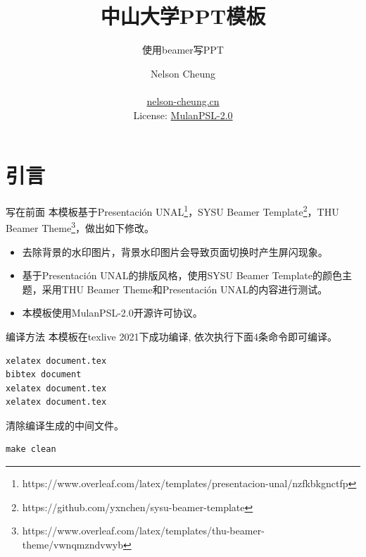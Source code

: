 \documentclass{libs/format}
\title[sysu ppt template]{中山大学PPT模板}
\subtitle{使用beamer写PPT}
\institute[Sun Yat-Sen University]{
  计算机学院 \\ 
  中山大学}
\date[\ctoday]{\ctoday}
\begin{document}


\author[Nelson Cheung]{
  Nelson Cheung \\\medskip
  {} \\
  {\url{nelson-cheung.cn}} \\
  {\small{License: \href{https://license.coscl.org.cn/MulanPSL2/}{MulanPSL-2.0}}}
}

\begin{frame}
  \titlepage
\end{frame}
\setcounter{framenumber}{0}

\begin{frame}
  \tableofcontents[sectionstyle=show,subsectionstyle=show/shaded/hide,subsubsectionstyle=show/shaded/hide]
  \addtocounter{framenumber}{-1}
\end{frame}



\section{引言}

\begin{frame}{写在前面}
  本模板基于Presentación UNAL\footnote[frame]{https://www.overleaf.com/latex/templates/presentacion-unal/nzfkbkgnctfp}，SYSU Beamer Template\footnote[frame]{https://github.com/yxnchen/sysu-beamer-template}，THU Beamer Theme\footnote[frame]{https://www.overleaf.com/latex/templates/thu-beamer-theme/vwnqmzndvwyb}，做出如下修改。
  \begin{itemize}
    \item 去除背景的水印图片，背景水印图片会导致页面切换时产生屏闪现象。
    \item 基于Presentación UNAL的排版风格，使用SYSU Beamer Template的颜色主题，采用THU Beamer Theme和Presentación UNAL的内容进行测试。
    \item 本模板使用MulanPSL-2.0开源许可协议。
  \end{itemize}
\end{frame}

\begin{frame}[fragile]{编译方法}
  本模板在texlive 2021下成功编译, 依次执行下面4条命令即可编译。
  \begin{lstlisting}
xelatex document.tex
bibtex document
xelatex document.tex
xelatex document.tex\end{lstlisting}
  清除编译生成的中间文件。
  \begin{lstlisting}
make clean\end{lstlisting}  

\end{frame}
\end{document}
